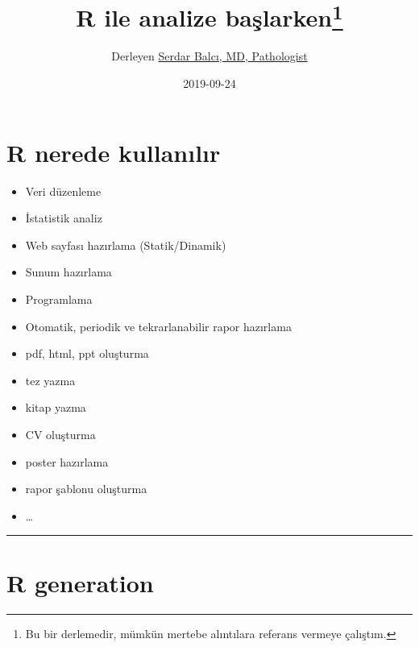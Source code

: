 \documentclass[]{article}
\title{R ile analize başlarken\footnote{Bu bir derlemedir, mümkün mertebe
  alıntılara referans vermeye çalıştım.}}
\author{Derleyen \href{https://sbalci.github.io/}{Serdar Balcı, MD, Pathologist}}
\date{2019-09-24}
\newenvironment{Shaded}{\begin{snugshade}}{\end{snugshade}}
\newcommand{\DataTypeTok}[1]{\textcolor[rgb]{0.13,0.29,0.53}{#1}}
\newcommand{\KeywordTok}[1]{\textcolor[rgb]{0.13,0.29,0.53}{\textbf{#1}}}
\newcommand{\NormalTok}[1]{#1}
\newcommand{\OperatorTok}[1]{\textcolor[rgb]{0.81,0.36,0.00}{\textbf{#1}}}
\newcommand{\OtherTok}[1]{\textcolor[rgb]{0.56,0.35,0.01}{#1}}
\providecommand{\tightlist}{%
  \setlength{\itemsep}{0pt}\setlength{\parskip}{0pt}}
\begin{document}
\maketitle

{
\setcounter{tocdepth}{5}
\tableofcontents
}
\begin{Shaded}
\end{Shaded}

\hypertarget{r-nerede-kullanilir}{%
\section{R nerede kullanılır}\label{r-nerede-kullanilir}}

\begin{itemize}
\tightlist
\item
  Veri düzenleme
\item
  İstatistik analiz
\item
  Web sayfası hazırlama (Statik/Dinamik)
\item
  Sunum hazırlama
\item
  Programlama
\item
  Otomatik, periodik ve tekrarlanabilir rapor hazırlama
\item
  pdf, html, ppt oluşturma
\item
  tez yazma
\item
  kitap yazma
\item
  CV oluşturma
\item
  poster hazırlama
\item
  rapor şablonu oluşturma
\item
  \ldots{}
\end{itemize}

\begin{center}\rule{0.5\linewidth}{\linethickness}\end{center}

\hypertarget{r-generation}{%
\section{R generation}\label{r-generation}}
\end{document}
